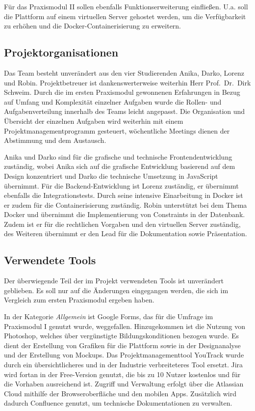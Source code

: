 Für das Praxismodul II sollen ebenfalls Funktionserweiterung einfließen.
U.a. soll die Plattform auf einem virtuellen Server gehostet werden, um die Verfügbarkeit zu erhöhen und die Docker-Containerisierung zu erweitern.


\subsection{Projektorganisationen}\label{subsec:subsection-one-three}

Das Team besteht unverändert aus den vier Studierenden Anika, Darko, Lorenz und Robin.
Projektbetreuer ist dankenswerterweise weiterhin Herr Prof.\, Dr.\, Dirk Schweim.
Durch die im ersten Praxismodul gewonnenen Erfahrungen in Bezug auf Umfang und Komplexität einzelner Aufgaben wurde die Rollen- und Aufgabenverteilung innerhalb des Teams leicht angepasst.
Die Organisation und Übersicht der einzelnen Aufgaben wird weiterhin mit einem Projektmanagementprogramm gesteuert, wöchentliche Meetings dienen der Abstimmung und dem Austausch.

Anika und Darko sind für die grafische und technische Frontendentwicklung zuständig, wobei Anika sich auf die grafische Entwicklung basierend auf dem Design konzentriert und Darko die technische Umsetzung in JavaScript übernimmt.
Für die Backend-Entwicklung ist Lorenz zuständig, er übernimmt ebenfalls die Integrationstests.
Durch seine intensive Einarbeitung in Docker ist er zudem für die Containerisierung zuständig.
Robin unterstützt bei dem Thema Docker und übernimmt die Implementierung von Constraints in der Datenbank.
Zudem ist er für die rechtlichen Vorgaben und den virtuellen Server zuständig, des Weiteren übernimmt er den Lead für die Dokumentation sowie Präsentation.


\subsection{Verwendete Tools}\label{subsec:subsection-one-four}

Der überwiegende Teil der im Projekt verwendeten Tools ist unverändert geblieben.
Es soll nur auf die Änderungen eingegangen werden, die sich im Vergleich zum ersten Praxismodul ergeben haben.

In der Kategorie \textit{Allgemein} ist Google Forms, das für die Umfrage im Praxismodul I genutzt wurde, weggefallen.
Hinzugekommen ist die Nutzung von Photoshop, welches über vergünstigte Bildungskonditionen bezogen wurde.
Es dient der Erstellung von Grafiken für die Plattform sowie in der Designanalyse und der Erstellung von Mockups.
Das Projektmanagementtool YouTrack wurde durch ein übersichtlicheres und in der Industrie verbreiteteres Tool ersetzt.
Jira wird fortan in der Free-Version genutzt, die bis zu 10 Nutzer kostenlos und für die Vorhaben ausreichend ist.
Zugriff und Verwaltung erfolgt über die Atlassian Cloud mithilfe der Browseroberfläche und den mobilen Apps.
Zusätzlich wird dadurch Confluence genutzt, um technische Dokumentationen zu verwalten.

